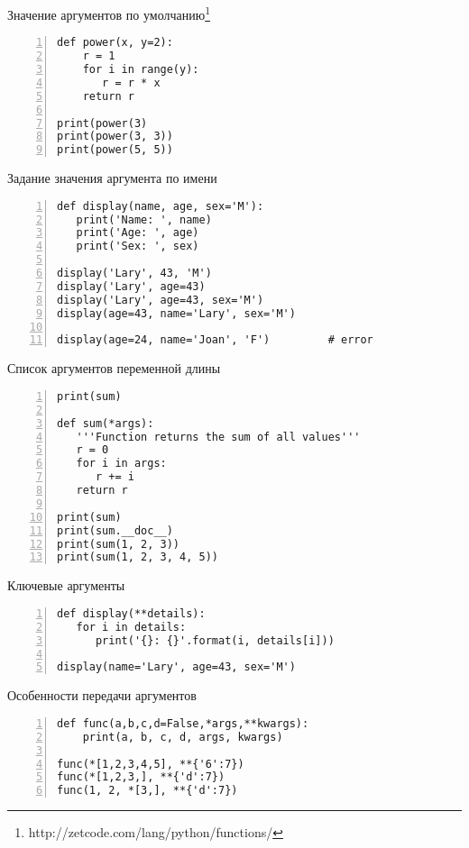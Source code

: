 \documentclass[hyperref={pdftex,unicode}]{beamer}
\begin{document}
\begin{frame}[fragile]{Значение аргументов по умолчанию\footnote[frame]{
      http://zetcode.com/lang/python/functions/
}}
  \begin{lstlisting}[numbers=left]
def power(x, y=2):
    r = 1
    for i in range(y):
       r = r * x
    return r

print(power(3)
print(power(3, 3))
print(power(5, 5))
  \end{lstlisting}
\end{frame}

\begin{frame}[fragile]{Задание значения аргумента по имени}
  \begin{lstlisting}[numbers=left]
def display(name, age, sex='M'):
   print('Name: ', name)
   print('Age: ', age)
   print('Sex: ', sex)

display('Lary', 43, 'M')
display('Lary', age=43)
display('Lary', age=43, sex='M')
display(age=43, name='Lary', sex='M')

display(age=24, name='Joan', 'F')         # error
\end{lstlisting}
\end{frame}

\begin{frame}[fragile]{Список аргументов переменной длины}
  \begin{lstlisting}[numbers=left]
print(sum)

def sum(*args):
   '''Function returns the sum of all values'''
   r = 0
   for i in args:
      r += i
   return r

print(sum)
print(sum.__doc__)
print(sum(1, 2, 3))
print(sum(1, 2, 3, 4, 5))
  \end{lstlisting}
\end{frame}

\begin{frame}[fragile]{Ключевые аргументы}
  \begin{lstlisting}[numbers=left]
def display(**details):
   for i in details:
      print('{}: {}'.format(i, details[i]))

display(name='Lary', age=43, sex='M')
  \end{lstlisting}
\end{frame}

\begin{frame}[fragile]{Особенности передачи аргументов}
  \begin{lstlisting}[numbers=left]
def func(a,b,c,d=False,*args,**kwargs):
    print(a, b, c, d, args, kwargs)

func(*[1,2,3,4,5], **{'6':7})
func(*[1,2,3,], **{'d':7})
func(1, 2, *[3,], **{'d':7})
  \end{lstlisting}
\end{frame}
\end{document}
